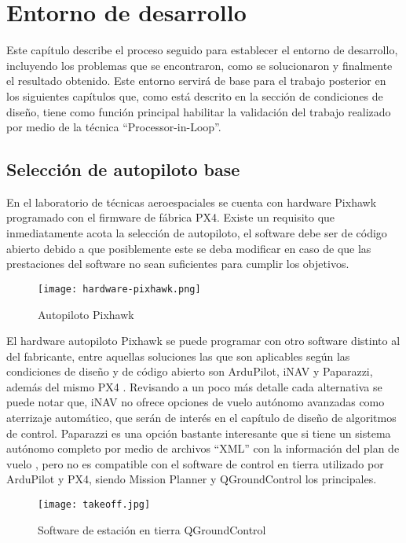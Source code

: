 \chapter{Entorno de desarrollo}

Este capítulo describe el proceso seguido para establecer el entorno de desarrollo, incluyendo los problemas que se encontraron, como se solucionaron y finalmente el resultado obtenido. Este entorno servirá de base para el trabajo posterior en los siguientes capítulos que, como está descrito en la sección de condiciones de diseño, tiene como función principal habilitar la validación del trabajo realizado por medio de la técnica ``Processor-in-Loop''.

\section{Selección de autopiloto base}

En el laboratorio de técnicas aeroespaciales se cuenta con hardware Pixhawk programado con el firmware de fábrica PX4. Existe un requisito que inmediatamente acota la selección de autopiloto, el software debe ser de código abierto debido a que posiblemente este se deba modificar en caso de que las prestaciones del software no sean suficientes para cumplir los objetivos.

\begin{figure}[h]
    \centering
    \texttt{[image: hardware-pixhawk.png]}
    \caption{Autopiloto Pixhawk}
    \label{fig:pixhawk1}
\end{figure}

El hardware autopiloto Pixhawk se puede programar con otro software distinto al del fabricante, entre aquellas soluciones las que son aplicables según las condiciones de diseño y de código abierto son ArduPilot, iNAV y Paparazzi, además del mismo PX4 \cite{survey}. Revisando a un poco más detalle cada alternativa se puede notar que, iNAV no ofrece opciones de vuelo autónomo avanzadas como aterrizaje automático, que serán de interés en el capítulo de diseño de algoritmos de control. Paparazzi es una opción bastante interesante que si tiene un sistema autónomo completo por medio de archivos ``XML'' con la información del plan de vuelo \cite{paparazzi_flight_plan}, pero no es compatible con el software de control en tierra utilizado por ArduPilot y PX4, siendo Mission Planner y QGroundControl los principales.

\begin{figure}[h]
    \centering
    \texttt{[image: takeoff.jpg]}
    \caption{Software de estación en tierra QGroundControl}
    \label{fig:qgroundcontrol}
\end{figure}

